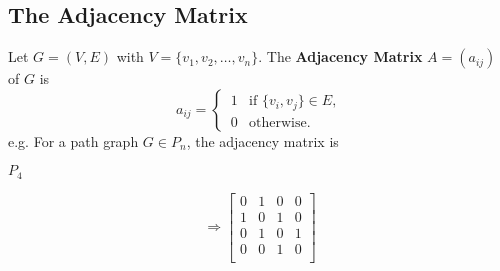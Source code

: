 \documentclass[11pt]{article}
\begin{document}
\subsection{The Adjacency Matrix}
Let $G = (V,E)$ with $V = \{v_1, v_2, \dots, v_n\}$. The \textbf{Adjacency Matrix} $A=(a_{ij})$ of $G$ is
\[
    a_{ij} = 
    \begin{cases}
        \displaystyle
        \,1 & \text{if } \{v_i,v_j\}\in E,\\
        \displaystyle
        \,0 & \text{otherwise}.
    \end{cases}
\]
e.g. For a path graph $G \in P_n$, the adjacency matrix is 
\newline
\begin{minipage}{\textwidth}
    \centering
    \begin{minipage}[][70pt][c]{.3\textwidth}
        $P_4\,$ 
        \centering
    \end{minipage}
    \begin{minipage}[m][70pt][c]{.2\textwidth}
    \vfill
    \[
        \Rightarrow
        \begin{bmatrix}
            0 & 1 & 0 & 0\\
            1 & 0 & 1 & 0\\
            0 & 1 & 0 & 1\\
            0 & 0 & 1 & 0\\
        \end{bmatrix}
    \]
    \vfill
    \end{minipage}
\end{minipage}
        
\end{document}

